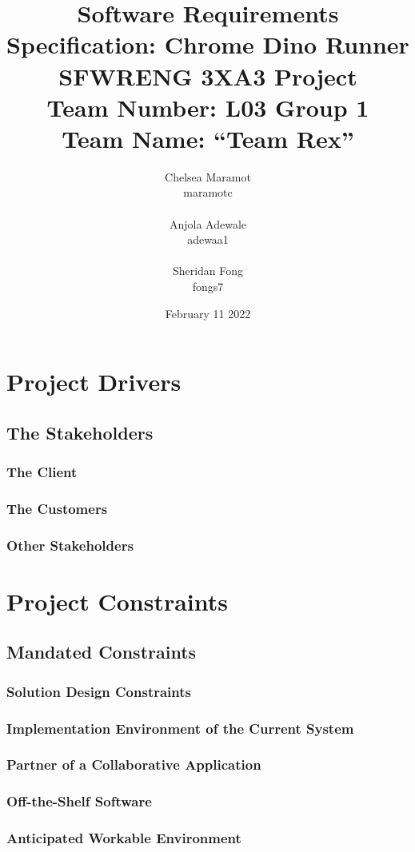 \documentclass{article}
\title{Software Requirements Specification: Chrome Dino Runner \\ \bigskip \large SFWRENG 3XA3 Project \\ \bigskip \large Team Number: L03 Group 1 \\ \large Team Name: ``Team Rex'' }
\author{Chelsea Maramot \\ maramotc \\ \\ Anjola Adewale \\ adewaa1 \\ \\ Sheridan Fong \\ fongs7 }
\date{February 11 2022}
\begin{document}
\maketitle

\section{Project Drivers}
\subsection{The Stakeholders}
\subsubsection{The Client}
\subsubsection{The Customers}
\subsubsection{Other Stakeholders}



\section{Project Constraints}

\subsection{Mandated Constraints}
\subsubsection{Solution Design Constraints}
\subsubsection{Implementation Environment of the Current System}
\subsubsection{Partner of a Collaborative Application}
\subsubsection{Off-the-Shelf Software}
\subsubsection{Anticipated Workable Environment}
\end{document}
